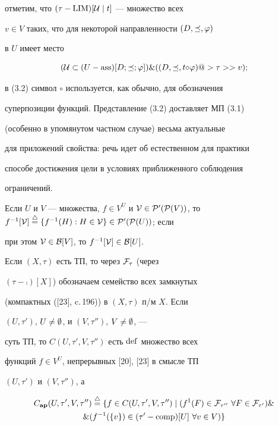отметим, что $(\tau - {\operatorname{LIM}})[{\cal U} \mid t]$ --- множество всех


$v \in V$ таких, что для некоторой направленности $(D,\preceq,\varphi)$


в $U$ имеет место


\begin{equation}


({\cal U} \subset (U - {\ass})[D;\preceq;\vp]) \& ((D,\preceq,t{\circ}\vp)


@>{\tau}>> v);


\end{equation}


в (3.2) символ $\circ$ используется, как обычно, для обозначения


суперпозиции функций. Представление (3.2) доставляет МП (3.1)


(особенно в упомянутом частном случае) весьма актуальные


для приложений свойства: речь идет об естественном для практики


способе достижения цели в условиях приближенного соблюдения


ограничений.





Если $U$ и $V$ --- множества, $f \in {V^U}$ и ${\cal V} \in


{{\cal P}'}({{\cal P}(V)})$, то ${f^{-1}}[{\cal V}] \stac


\{{f^{-1}}(H):H \in {\cal V}\} \in {{\cal P}'}({{\cal P}(U)})$; если


при этом ${\cal V} \in {{\cal B}[V]}$, то ${f^{-1}}[{\cal V}] \in


{{\cal B}[U]}$.





Если $(X,\tau)$ есть ТП, то через ${\cal F}_\tau$ (через


$(\tau - {\comp})[X]$) обозначаем семейство всех замкнутых


(компактных ([23], c.\,196)) в $(X,\tau)$ п/м $X$. Если


$(U,{{\tau}'})$, $U \ne \emptyset$, и $(V,{{\tau}''})$, $V \ne \emptyset$, ---


суть ТП, то $C(U,{{\tau}'},V,{{\tau}''})$ есть $\operatorname{def}$ множество всех


функций $f \in {V^U}$, непрерывных [20], [23] в смысле ТП


$(U,{{\tau}'})$ и $(V,{{\tau}''})$, а


\begin{multline}


{C_{{\bold a}{\bold p}}}(U,{{\tau}'},V,{{\tau}''}) \stac \{f \in


C(U,{{\tau}'},V,{{\tau}''}) \mid


({f^1}(F) \in {{\cal F}_{{\tau}''}}


\ \fo{F} \in {{\cal F}_{{\tau}'}}) \& \\


\&({f^{-1}}(\{v\}) \in ({{\tau}'} - {\comp})[U]\ \fo{v} \in V)\}


\end{multline}


